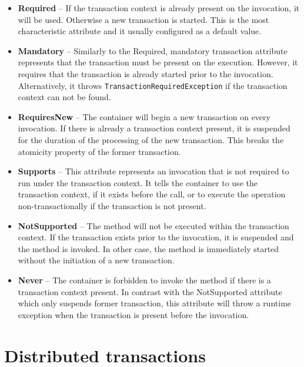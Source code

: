 \documentclass[oneside,
  digital, %
  table,   %
  nolof,     %
  nolot,     %
]{fithesis3}
\begin{document}
\begin{itemize}
    \item \textbf{Required} -- If the transaction context is already present on the invocation, it will be used. Otherwise a new transaction is started. This is the most characteristic attribute and it usually configured as a default value.
    
    \item \textbf{Mandatory} -- Similarly to the Required, mandatory transaction attribute represents that the transaction must be present on the execution. However, it requires that the transaction is already started prior to the invocation. Alternatively, it throws \texttt{TransactionRequiredException} if the transaction context can not be found.
    
    \item \textbf{RequiresNew} -- The container will begin a new transaction on every invocation. If there is already a transaction context present, it is suspended for the duration of the processing of the new transaction. This breaks the atomicity property of the former transaction.
    
    \item \textbf{Supports} -- This attribute represents an invocation that is not required to run under the transaction context. It tells the container to use the transaction context, if it exists before the call, or to execute the operation non-transactionally if the transaction is not present.
    
    \item \textbf{NotSupported} -- The method will not be executed within the transaction context. If the transaction exists prior to the invocation, it is suspended and the method is invoked. In other case, the method is immediately started without the initiation of a new transaction.
    
    \item \textbf{Never} -- The container is forbidden to invoke the method if there is a transaction context present. In contrast with the NotSupported attribute which only suspends former transaction, this attribute will throw a runtime exception when the transaction is present before the invocation.
\end{itemize}

\section{Distributed transactions}
\end{document}
